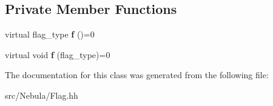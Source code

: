 \subsection*{\-Private \-Member \-Functions}
\begin{DoxyCompactItemize}
\item 
\hypertarget{classgal_1_1flag_abac6a7ca950ba7e95b20ac64abbd7bdd}{virtual flag\-\_\-type {\bfseries f} ()=0}\label{classgal_1_1flag_abac6a7ca950ba7e95b20ac64abbd7bdd}

\item 
\hypertarget{classgal_1_1flag_ab22ce33d5b35eb8c0283b3720f8bc0ce}{virtual void {\bfseries f} (flag\-\_\-type)=0}\label{classgal_1_1flag_ab22ce33d5b35eb8c0283b3720f8bc0ce}

\end{DoxyCompactItemize}


\-The documentation for this class was generated from the following file\-:\begin{DoxyCompactItemize}
\item 
src/\-Nebula/\-Flag.\-hh\end{DoxyCompactItemize}
